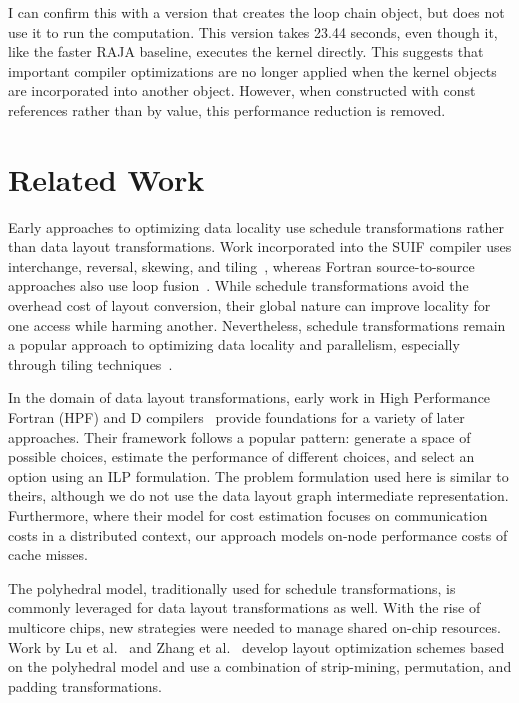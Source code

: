 I can confirm this with a version that creates the loop chain object, but does not use it to run the computation.
This version takes 23.44 seconds, even though it, like the faster RAJA baseline, executes the kernel directly.
This suggests that important compiler optimizations are no longer applied when the kernel objects are incorporated into another object. 
However, when constructed with const references rather than by value, this performance reduction is removed.

\section{Related Work}

Early approaches to optimizing data locality use schedule transformations rather than data layout transformations. 
Work incorporated into the SUIF compiler uses interchange, reversal, skewing, and tiling~\cite{wolf1991data}, whereas Fortran source-to-source approaches also use loop fusion~\cite{mckinley1996improving}.
While schedule transformations avoid the overhead cost of layout conversion, their global nature can improve locality for one access while harming another.
Nevertheless, schedule transformations remain a popular approach to optimizing data locality and parallelism, 
especially through tiling techniques~\cite{bondhugula2008pluto,bertolacci2015parameterized,bondhugula2016diamond,bandishti2012tiling,unat2016tida}.

In the domain of data layout transformations, early work in High Performance Fortran (HPF) and D compilers~\cite{bixby1994automatic,kennedy1995automatic,kennedy1998automatic} provide foundations for a variety of later approaches.
Their framework follows a popular pattern: generate a space of possible choices, estimate the performance of different choices, and select an option using an ILP formulation. 
The problem formulation used here is similar to theirs, although we do not use the data layout graph intermediate representation.
Furthermore, where their model for cost estimation focuses on communication costs in a distributed context, our approach models on-node performance costs of cache misses.

The polyhedral model, traditionally used for schedule transformations, is commonly leveraged for data layout transformations as well.
With the rise of multicore chips, new strategies were needed to manage shared on-chip resources. 
Work by Lu et al.~\cite{lu2009data} and Zhang et al.~\cite{zhang2011optimizing} develop layout optimization schemes based on the polyhedral model and use a combination of strip-mining, permutation, and padding transformations.


